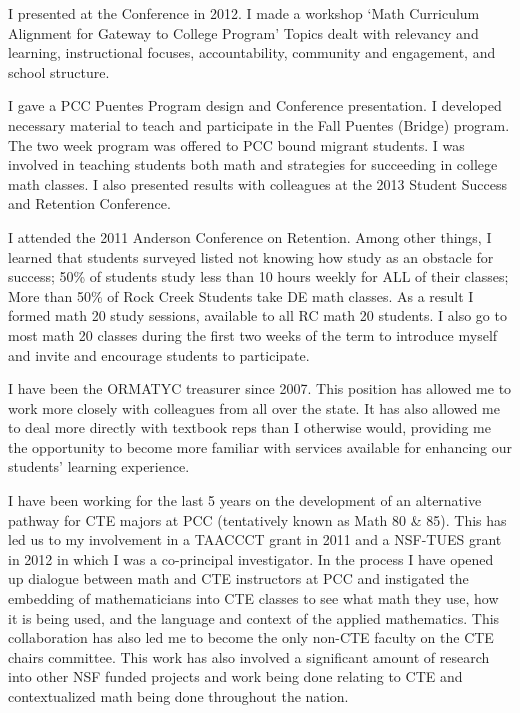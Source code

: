 \begin{description}[style=nextline]
	I presented at the Conference in 2012. I made a workshop `Math Curriculum
	Alignment for Gateway to College Program' Topics dealt with relevancy and
	learning, instructional focuses, accountability, community and engagement, and
	school structure.

	\item[Diane Edwards (Full-Time Instructor, Rock Creek Campus)]
	I gave a PCC Puentes Program design and Conference presentation.  I developed
	necessary material to teach and participate in the Fall Puentes (Bridge)
	program. The two week program was offered to PCC bound migrant students. I was
	involved in teaching students both math and strategies for succeeding in
	college math classes. I also presented results with colleagues at the 2013
	Student Success and Retention Conference.

	I attended the 2011 Anderson Conference on Retention. Among other things, I
	learned that students surveyed listed not knowing how study as an
	obstacle for success; 50\% of students study less than 10 hours weekly for ALL
	of their classes; More than 50\% of Rock Creek Students take DE math classes. As
	a result I formed math 20 study sessions, available to all RC math 20 students.
	I also go to most math 20 classes during the first two weeks of the term to
	introduce myself and invite and encourage students to participate.

	\item[Lisa Folberg (Full-time Instructor, Rock Creek Campus)]
	I have been the ORMATYC treasurer since 2007.  This position has allowed me to
	work more closely with colleagues from all over the state.  It has also allowed
	me to deal more directly with textbook reps than I otherwise would, providing
	me the opportunity to become more familiar with services available for
	enhancing our students' learning experience.

	\item[Ross Folberg (Full-time Instructor, Sylvania Campus)]
	I have been working for the last 5 years on the development of an alternative
	pathway for CTE majors at PCC (tentatively known as Math 80 \& 85).  This has
	led us to my involvement in a TAACCCT grant in 2011 and a NSF-TUES grant in
	2012 in which I was a co-principal investigator.  In the process I have opened
	up dialogue between math and CTE instructors at PCC and instigated the
	embedding of mathematicians into CTE classes to see what math they use, how it
	is being used, and the language and context of the applied mathematics.  This
	collaboration has also led me to become the only non-CTE faculty on the CTE
	chairs committee.  This work has also involved a significant amount of research
	into other NSF funded projects and work being done relating to CTE and
	contextualized math being done throughout the nation.


\end{description}
